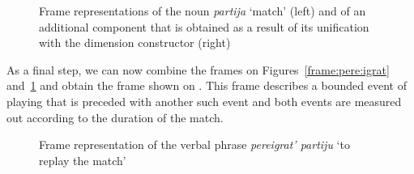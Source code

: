 \begin{figure}\small
\hfill%
\caption{Frame representations of the noun \textit{partija} `match' (left) and of an additional component that is obtained as a result of its unification with the dimension constructor (right) \label{frame:match}}
\end{figure}

As a final step, we can now combine the frames on Figures~\ref{frame:pere:igrat} and~\ref{frame:match} and obtain the frame shown on . This frame describes a bounded event of playing that is preceded with another such event and both events are measured out according to the duration of the match. 

\begin{figure}\small
{}
\caption{Frame representation of the verbal phrase \textit{pereigrat' partiju} `to replay the match' \label{frame:pere:igrat:match}}
\end{figure}

